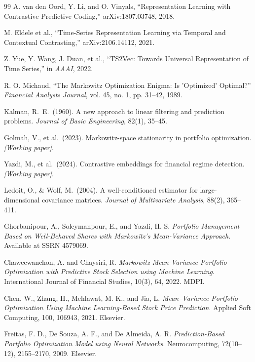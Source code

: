 \documentclass[preprint,12pt]{elsarticle}
\theoremstyle{plain}
\theoremstyle{definition}
\begin{document}
\begin{thebibliography}{99}
A. van den Oord, Y. Li, and O. Vinyals,
``Representation Learning with Contrastive Predictive Coding,''
arXiv:1807.03748, 2018.

M. Eldele et al.,
``Time-Series Representation Learning via Temporal and Contextual Contrasting,''
arXiv:2106.14112, 2021.

Z. Yue, Y. Wang, J. Duan, et al.,
``TS2Vec: Towards Universal Representation of Time Series,''
in \textit{AAAI}, 2022.

R. O. Michaud,
``The Markowitz Optimization Enigma: Is 'Optimized' Optimal?''
\textit{Financial Analysts Journal}, vol. 45, no. 1, pp. 31--42, 1989.

Kalman, R.\ E.\ (1960).
A new approach to linear filtering and prediction problems.
\textit{Journal of Basic Engineering}, 82(1), 35--45.

Golmah, V., et al.\ (2023).
Markowitz-space stationarity in portfolio optimization.
\textit{[Working paper]}.

Yazdi, M., et al.\ (2024).
Contrastive embeddings for financial regime detection.
\textit{[Working paper]}.

Ledoit, O., \& Wolf, M.\ (2004).
A well-conditioned estimator for large-dimensional covariance matrices.
\textit{Journal of Multivariate Analysis}, 88(2), 365--411.

Ghorbanipour, A., Soleymanpour, E., and Yazdi, H. S.  
\textit{Portfolio Management Based on Well-Behaved Shares with Markowitz's Mean-Variance Approach}.  
Available at SSRN 4579069.

Chaweewanchon, A. and Chaysiri, R.  
\textit{Markowitz Mean-Variance Portfolio Optimization with Predictive Stock Selection using Machine Learning}.  
International Journal of Financial Studies, 10(3), 64, 2022. MDPI.

Chen, W., Zhang, H., Mehlawat, M. K., and Jia, L.  
\textit{Mean--Variance Portfolio Optimization Using Machine Learning-Based Stock Price Prediction}.  
Applied Soft Computing, 100, 106943, 2021. Elsevier.

Freitas, F. D., De Souza, A. F., and De Almeida, A. R.  
\textit{Prediction-Based Portfolio Optimization Model using Neural Networks}.  
Neurocomputing, 72(10--12), 2155--2170, 2009. Elsevier.


\end{thebibliography}
\end{document}
